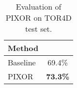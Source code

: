\begin{table}[t]
\begin{center}
\begin{small}
\begin{tabular}{|l|c|}
\hline
Method &  \\
\hline
Baseline \cite{yolo} & 69.4\% \\
PIXOR & \textbf{73.3\%} \\
\hline
\end{tabular}
\caption{Evaluation of PIXOR on TOR4D test set.}
\label{tab:our-data}
\end{small}
\end{center}
\vspace{-0.7cm}
\end{table}
